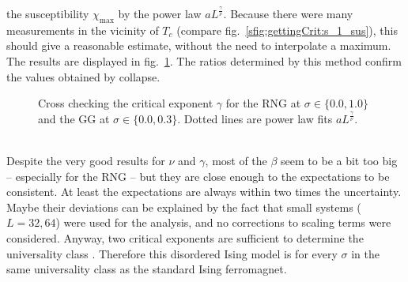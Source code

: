     the susceptibility \(\chi_{\mathrm{max}}\) by the power law \(aL^\frac{\gamma}{\nu}\).
    Because there were
    many measurements in the vicinity of \(T_c\) (compare fig.\ \ref{sfig:gettingCrit:s_1_sus}),
    this should give a reasonable estimate, without the need to
    interpolate a maximum.
    The results are displayed in fig.\ \ref{fig:susCrossCheck}. The ratios
    determined by this method confirm the values obtained by collapse.
    \begin{figure}[htbp]
        \centering
        \caption[Alternative Way Determining $\gamma$]
        {
            Cross checking the critical exponent $\gamma$ for
                 the RNG at $\sigma \in \{0.0, 1.0\}$ and
                 the GG at $\sigma \in \{0.0, 0.3\}$.
            Dotted lines are power law fits \(aL^\frac{\gamma}{\nu}\).
        }
        \label{fig:susCrossCheck}
    \end{figure}\\
    Despite the very good results for \(\nu\) and \(\gamma\), most of the
    \(\beta\) seem to be a bit too big -- especially for the RNG -- but
    they are close enough to the expectations to be consistent. At least
    the expectations are always within two times the uncertainty.
    Maybe their deviations can be explained by the fact that small
    systems (\(L=32,64\)) were used for the analysis, and no corrections
    to scaling terms were considered.
    Anyway, two critical exponents are sufficient to determine the
    universality class \cite[p. 145]{Katzgraber2011}. Therefore this
    disordered Ising model is for every \(\sigma\) in the same universality
    class as the standard Ising ferromagnet.

